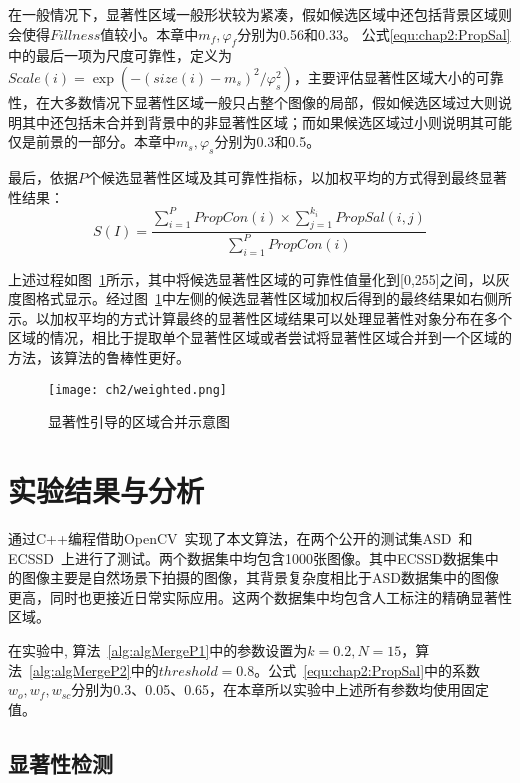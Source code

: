 在一般情况下，显著性区域一般形状较为紧凑，假如候选区域中还包括背景区域则会使得$Fillness$值较小。本章中$m_f,\varphi_f$分别为0.56和0.33。 公式\ref{equ:chap2:PropSal}中的最后一项为尺度可靠性，定义为$Scale(i)= \exp(-(size(i)- m_s)^2/\varphi_s^2)$，主要评估显著性区域大小的可靠性，在大多数情况下显著性区域一般只占整个图像的局部，假如候选区域过大则说明其中还包括未合并到背景中的非显著性区域；而如果候选区域过小则说明其可能仅是前景的一部分。本章中$m_s,\varphi_s$分别为0.3和0.5。\par

最后，依据$P$个候选显著性区域及其可靠性指标，以加权平均的方式得到最终显著性结果：
$$ S(I) = \frac{\sum_{i=1}^{P}PropCon(i) \times \sum_{j=1}^{k_i}PropSal(i,j)}{\sum_{i=1}^{P}PropCon(i)}$$

上述过程如图~\ref{fig:weighted}所示，其中将候选显著性区域的可靠性值量化到[0,255]之间，以灰度图格式显示。经过图~\ref{fig:weighted}中左侧的候选显著性区域加权后得到的最终结果如右侧所示。以加权平均的方式计算最终的显著性区域结果可以处理显著性对象分布在多个区域的情况，相比于提取单个显著性区域或者尝试将显著性区域合并到一个区域的方法，该算法的鲁棒性更好。
\begin{figure}[htb]
  \centering%
      {\texttt{[image: ch2/weighted.png]}}\\

  \caption{显著性引导的区域合并示意图}
  \label{fig:weighted}
\end{figure}

\section{实验结果与分析}
\label{sec:results}


通过C++编程借助OpenCV~\cite{opencv_library}实现了本文算法，在两个公开的测试集ASD~\cite{Achanta08}和ECSSD~\cite{ECSSD}上进行了测试。两个数据集中均包含1000张图像。其中ECSSD数据集中的图像主要是自然场景下拍摄的图像，其背景复杂度相比于ASD数据集中的图像更高，同时也更接近日常实际应用。这两个数据集中均包含人工标注的精确显著性区域。\par
在实验中, 算法~\ref{alg:algMergeP1}中的参数设置为$k=0.2,N=15$，算法~\ref{alg:algMergeP2}中的$threshold=0.8$。公式~\ref{equ:chap2:PropSal}中的系数$w_o,w_f,w_{sc}$分别为0.3、0.05、0.65，在本章所以实验中上述所有参数均使用固定值。

\subsection{显著性检测}
\label{sec:sub:saliencyRst}

